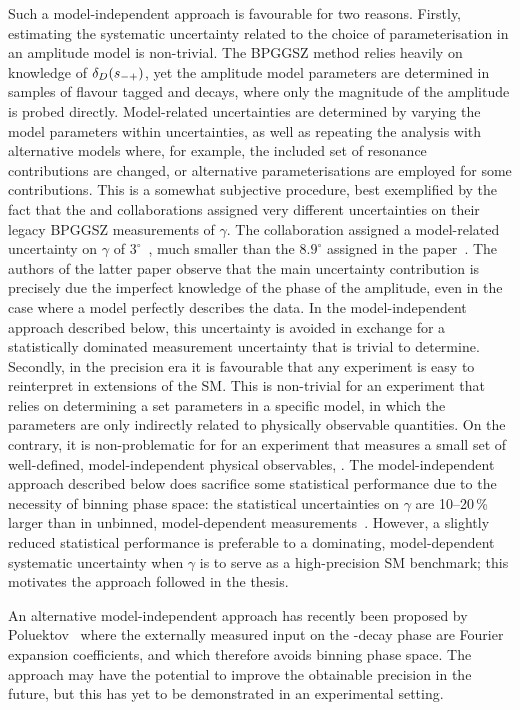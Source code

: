 Such a model-independent approach is favourable for two reasons. Firstly, estimating the systematic uncertainty related to the choice of parameterisation in an amplitude model is non-trivial. The BPGGSZ method relies heavily on knowledge of $\delta_D(s_{-+})$, yet the amplitude model parameters are determined in samples of flavour tagged \Dz and \Dzb decays, where only the magnitude of the amplitude is probed directly. Model-related uncertainties are determined by varying the model parameters within uncertainties, as well as repeating the analysis with alternative models where, for example, the included set of resonance contributions are changed, or alternative parameterisations are employed for some contributions. This is a somewhat subjective procedure, best exemplified by the fact that the \babar and \belle collaborations assigned very different uncertainties on their legacy BPGGSZ measurements of $\gamma$. The \babar collaboration assigned a model-related uncertainty on $\gamma$ of $3^\circ$~\cite{BABAR2010}, much smaller than the $8.9^\circ$ assigned in the \belle paper~\cite{BELLE2010}. The authors of the latter paper observe that the main uncertainty contribution is precisely due the imperfect knowledge of the phase of the amplitude, even in the case where a model perfectly describes the data. In the model-independent approach described below, this uncertainty is avoided in exchange for a statistically dominated measurement uncertainty that is trivial to determine. 
Secondly, in the precision era it is favourable that any experiment is easy to reinterpret in  extensions of the SM. This is non-trivial for an experiment that relies on determining a set parameters in a specific  model, in which the parameters are only indirectly related to physically observable quantities. On the contrary, it is non-problematic for for an experiment that measures a small set of well-defined, model-independent physical observables, . The model-independent approach described below does sacrifice some statistical performance due to the necessity of binning phase space: the statistical uncertainties on $\gamma$ are 10--20\,\% larger than in unbinned, model-dependent measurements~\cite{bondarUseQuantumcorrelatedD02008}. However, a slightly reduced statistical performance is preferable to a dominating, model-dependent systematic uncertainty when $\gamma$ is to serve as a high-precision SM benchmark; this motivates the approach followed in the thesis.

An alternative model-independent approach has recently been proposed by Poluektov~\cite{poluektovUnbinnedModelindependentMeasurements2018} where the externally measured input on the \D-decay phase are Fourier expansion coefficients, and which therefore avoids binning phase space. The approach may have the potential to improve the obtainable precision in the future, but this has yet to be demonstrated in an experimental setting.


